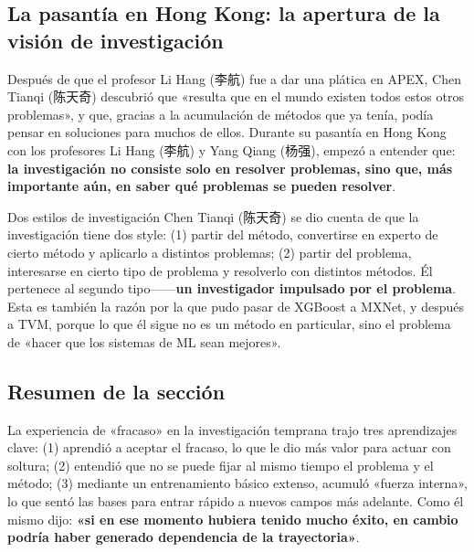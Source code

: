 \subsection{La pasantía en Hong Kong: la apertura de la visión de investigación}

Después de que el profesor Li Hang (李航) fue a dar una plática en APEX, Chen Tianqi (陈天奇) descubrió que «resulta que en el mundo existen todos estos otros problemas», y que, gracias a la acumulación de métodos que ya tenía, podía pensar en soluciones para muchos de ellos. Durante su pasantía en Hong Kong con los profesores Li Hang (李航) y Yang Qiang (杨强), empezó a entender que: \textbf{la investigación no consiste solo en resolver problemas, sino que, más importante aún, en saber qué problemas se pueden resolver}.

\begin{knowledgebox}{Dos estilos de investigación}
Chen Tianqi (陈天奇) se dio cuenta de que la investigación tiene dos style: (1) partir del método, convertirse en experto de cierto método y aplicarlo a distintos problemas; (2) partir del problema, interesarse en cierto tipo de problema y resolverlo con distintos métodos. Él pertenece al segundo tipo------\textbf{un investigador impulsado por el problema}. Esta es también la razón por la que pudo pasar de XGBoost a MXNet, y después a TVM, porque lo que él sigue no es un método en particular, sino el problema de «hacer que los sistemas de ML sean mejores».
\end{knowledgebox}

\subsection{Resumen de la sección}

La experiencia de «fracaso» en la investigación temprana trajo tres aprendizajes clave: (1) aprendió a aceptar el fracaso, lo que le dio más valor para actuar con soltura; (2) entendió que no se puede fijar al mismo tiempo el problema y el método; (3) mediante un entrenamiento básico extenso, acumuló «fuerza interna», lo que sentó las bases para entrar rápido a nuevos campos más adelante. Como él mismo dijo: \textbf{«si en ese momento hubiera tenido mucho éxito, en cambio podría haber generado dependencia de la trayectoria»}.
